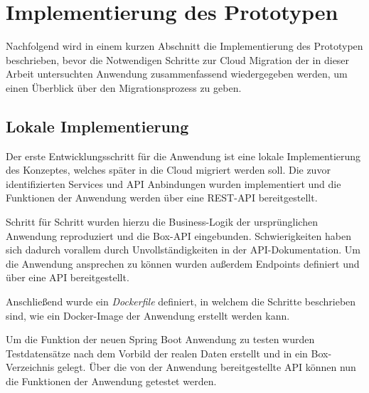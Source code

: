 \chapter{Implementierung des Prototypen}

Nachfolgend wird in einem kurzen Abschnitt die Implementierung des Prototypen beschrieben, bevor die Notwendigen Schritte zur Cloud Migration der in dieser Arbeit untersuchten Anwendung zusammenfassend wiedergegeben werden, um einen Überblick über den Migrationsprozess zu geben.

\section{Lokale Implementierung}
Der erste Entwicklungsschritt für die Anwendung ist eine lokale Implementierung des Konzeptes, welches später in die Cloud migriert werden soll. Die zuvor identifizierten Services und \ac{API} Anbindungen wurden implementiert und die Funktionen der Anwendung werden über eine \ac{REST}-\ac{API} bereitgestellt.

Schritt für Schritt wurden hierzu die Business-Logik der ursprünglichen Anwendung reproduziert und die \gls{Box}-\ac{API} eingebunden. Schwierigkeiten haben sich dadurch vorallem durch Unvollständigkeiten in der \ac{API}-Dokumentation. Um die Anwendung ansprechen zu können wurden außerdem Endpoints definiert und über eine \ac{API} bereitgestellt.

Anschließend wurde ein \textit{Dockerfile} definiert, in welchem die Schritte beschrieben sind, wie ein Docker-Image der Anwendung erstellt werden kann.

Um die Funktion der neuen \gls{Spring Boot} Anwendung zu testen wurden Testdatensätze nach dem Vorbild der realen Daten erstellt und in ein \gls{Box}-Verzeichnis gelegt. Über die von der Anwendung bereitgestellte \ac{API} können nun die Funktionen der Anwendung getestet werden. \pagebreak



